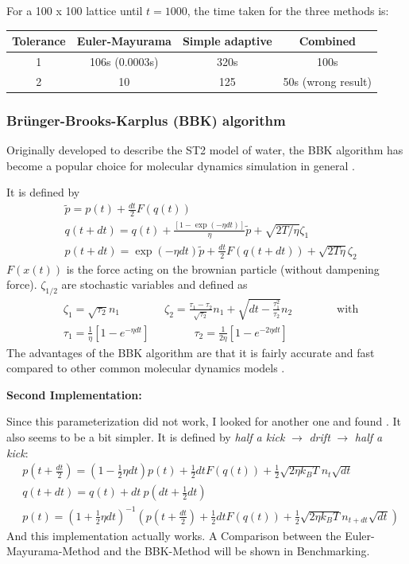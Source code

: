 	
	For a 100 x 100 lattice until $t =	1000$, the time taken for the three methods is:
	\begin{center}
		\begin{tabular}{c| c|c|c}
			\centering
			Tolerance & Euler-Mayurama & Simple adaptive & Combined \\  [0.5ex]
			\hline
			1 & 106s (0.0003s) & 320s & 100s \\
			2 & 10 & 125 & 50s (wrong result) \\
		\end{tabular}
	\end{center}
	
	\subsubsection{Brünger-Brooks-Karplus (BBK) algorithm}
	Originally developed to describe the ST2 model of water, the BBK algorithm has become a popular choice for molecular dynamics simulation in general \cite{brunger1984stochastic}.
	
	It is defined by
	\begin{align}
		&\tilde{p} =	p(t) + \frac{dt}{2} F(q(t)) \\
		&q(t + dt) =	q(t) + \frac{\left[1 - \exp( - \eta dt)\right]}{\eta} \tilde{p} + \sqrt{2T/\eta} \zeta_1 \\
		&p(t + dt) =	\exp(-\eta dt) \tilde{p} + \frac{dt}{2} F(q(t + dt)) + \sqrt{2 T \eta} \zeta_2
	\end{align}
	$F(x(t))$ is the force acting on the brownian particle (without dampening force). $\zeta_{1/2}$ are stochastic variables and defined as
	\begin{align}
		&\zeta_1 =	\sqrt{\tau_2} n_1 \qquad \qquad \zeta_2 = \frac{\tau_1 - \tau_2}{\sqrt{\tau_2}} n_1 + \sqrt{dt - \frac{\tau_1^2}{\tau_2}} n_2 	\qquad \qquad \text{with} \\
		&\tau_1 =	\frac{1}{\eta} \left[1 - e^{-\eta dt}\right] \qquad \qquad \tau_2 =	\frac{1}{2 \eta} \left[1 - e^{-2 \eta dt}\right]
	\end{align}
	The advantages of the BBK algorithm are that it is fairly accurate and fast compared to other common molecular dynamics models \cite{larini2007langevin}.
	
	\textbf{Second Implementation:}
	
	Since this parameterization did not work, I looked for another one and found \cite{izaguirre2001langevin}. It also seems to be a bit simpler. It is defined by \textit{half a kick} $\rightarrow$ \textit{drift} $\rightarrow$ \textit{half a kick}:
	\begin{align}
		&p\left(t + \frac{dt}{2}\right) =	\left(1 - \frac{1}{2} \eta dt \right) p(t) + \frac{1}{2} dt F(q(t)) + \frac{1}{2} \sqrt{2\eta{k_B T}} n_t \sqrt{dt}\\
		&q(t + dt) = q(t) + dt~ p\left(dt + \frac{1}{2} dt\right) \\
		&p\left(t\right) =	\left(1 + \frac{1}{2} \eta dt \right)^{-1} \left( p\left(t + \frac{dt}{2}\right) + \frac{1}{2} dt F(q(t)) + \frac{1}{2} \sqrt{2\eta{k_B T}} n_{t + dt} \sqrt{dt} \right)
	\end{align}
	And this implementation actually works. A Comparison between the Euler-Mayurama-Method and the BBK-Method will be shown in Benchmarking.
